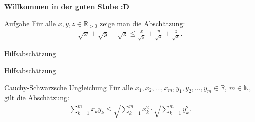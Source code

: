 \documentclass[10pt]{beamer}
\title{}
\author{Artur's Mathematikstübchen}
\date{}
\def\bN{\mathbb{N}}
\def\bR{\mathbb{R}}
\begin{document}

\begin{frame}
    \begin{center}
        \textbf{\huge Willkommen in der guten Stube \newline \newline :D}
    \end{center}
\end{frame}




\begin{frame}
    \begin{alertblock}{Aufgabe}
        Für alle \( x, y, z \in \bR_{> 0} \) zeige man die Abschätzung:
        \begin{align*}
            \sqrt{x} + \sqrt{y} + \sqrt{z}
            \leq \frac{x}{\sqrt{y}} + \frac{y}{\sqrt{z}} + \frac{z}{\sqrt{x}}.
        \end{align*}
    \end{alertblock}
\end{frame}



\begin{frame}{Hilfsabschätzung}
    
\end{frame}



\begin{frame}{Hilfsabschätzung}
    \begin{block}{Cauchy-Schwarzsche Ungleichung}
        Für alle \( x_{1}, x_{2}, \ldots, x_{m}, y_{1}, y_{2}, \ldots, y_{m} \in \bR \), \( m \in \bN \), gilt die Abschätzung:
        \begin{align*}
            \sum_{k = 1}^{m} x_{k} y_{k}
            \leq \sqrt{\sum_{k = 1}^{m} x_{k}^{2}} \cdot \sqrt{\sum_{k = 1}^{m} y_{k}^{2}}.
        \end{align*}
    \end{block}
\end{frame}
\end{document}
